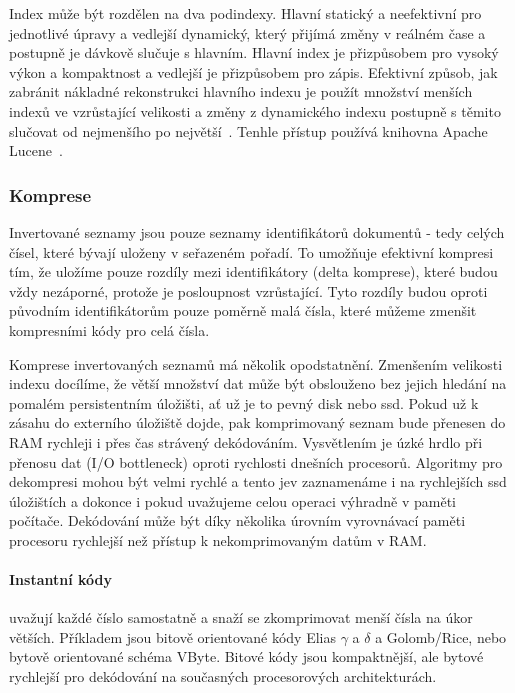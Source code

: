 \documentclass[11pt,letterpaper,oneside,openright]{book}
\begin{document}
Index může být rozdělen na dva podindexy. Hlavní statický a neefektivní pro
jednotlivé úpravy a vedlejší dynamický, který přijímá změny v reálném čase a
postupně je dávkově slučuje s hlavním. Hlavní index je přizpůsobem pro vysoký
výkon a kompaktnost a vedlejší je přizpůsobem pro zápis. Efektivní způsob, jak
zabránit nákladné rekonstrukci hlavního indexu je použít množství menších
indexů ve vzrůstající velikosti a změny z dynamického indexu postupně s těmito
slučovat od nejmenšího po největší~\citep[kap.~4]{Manning:2008:IIR:1394399}.
Tenhle přístup používá knihovna Apache Lucene~\cite{lsm_lucene}.

\subsubsection{Komprese}
Invertované seznamy jsou pouze seznamy identifikátorů dokumentů - tedy celých
čísel, které bývají uloženy v seřazeném pořadí. To umožňuje efektivní kompresi
tím, že uložíme pouze rozdíly mezi identifikátory (delta komprese), které budou
vždy nezáporné, protože je posloupnost vzrůstající. Tyto rozdíly budou oproti
původním identifikátorům pouze poměrně malá čísla, které můžeme zmenšit
kompresními kódy pro celá čísla.

Komprese invertovaných seznamů má několik opodstatnění. Zmenšením velikosti
indexu docílíme, že větší množství dat může být obslouženo bez jejich hledání
na pomalém persistentním úložišti, ať už je to pevný disk nebo ssd. Pokud už k
zásahu do externího úložiště dojde, pak komprimovaný seznam bude přenesen do
RAM rychleji i přes čas strávený dekódováním. Vysvětlením je úzké hrdlo při
přenosu dat (I/O bottleneck) oproti rychlosti dnešních procesorů. Algoritmy pro
dekompresi mohou být velmi rychlé a tento jev zaznamenáme i na rychlejších ssd
úložištích a dokonce i pokud uvažujeme celou operaci výhradně v paměti
počítače. Dekódování může být díky několika úrovním vyrovnávací paměti
procesoru rychlejší než přístup k nekomprimovaným datům v RAM. 

\paragraph{Instantní kódy} uvažují každé číslo samostatně a snaží se
zkomprimovat menší čísla na úkor větších. Příkladem jsou bitově orientované
kódy Elias $\gamma$ a $\delta$ a Golomb/Rice, nebo bytově orientované schéma
VByte. Bitové kódy jsou kompaktnější, ale bytové rychlejší pro dekódování na
současných procesorových architekturách.
\end{document}
